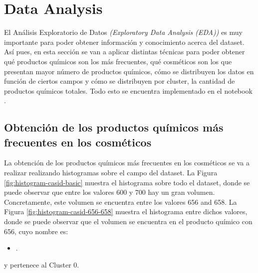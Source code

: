 
\section{Data Analysis}
\label{sec:results-data-analysis}

El Análisis Exploratorio de Datos \textit{(Exploratory Data Analysis (EDA))} \citep{eda} es muy importante para poder obtener información y conocimiento acerca del dataset. Así pues, en esta sección se van a aplicar distintas técnicas para poder obtener qué productos químicos son los más frecuentes, qué cosméticos son los que presentan mayor número de productos químicos, cómo se distribuyen los datos en función de ciertos campos y cómo se distribuyen por cluster, la cantidad de productos químicos totales. Todo esto se encuentra implementado en el notebook  \citep{master}.



\subsection{Obtención de los productos químicos más frecuentes en los cosméticos}
\label{sec:casid-histograms}

La obtención de los productos químicos más frecuentes en los cosméticos se va a realizar realizando histogramas sobre el campo  del dataset. La Figura \ref{fig:histogram-casid-basic} muestra el histograma sobre todo el dataset, donde se puede observar que entre los valores 600 y 700 hay un gran volumen. \\

Concretamente, este volumen se encuentra entre los valores 656 and 658. La Figura \ref{fig:histogram-casid-656-658} muestra el histograma entre dichos valores, donde se puede observar que el volumen se encuentra en el producto químico con  656, cuyo nombre es: 
\begin{itemize}
 \item {}.
\end{itemize}

y pertenece al Cluster 0. 

